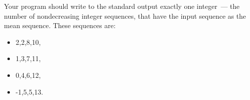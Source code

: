 Your program should write to the standard output exactly one integer~--- the number of nondecreasing integer
sequences, that have the input sequence as the mean sequence. These sequences are:

\begin{itemize}
\item 2,2,8,10,
\item 1,3,7,11,
\item 0,4,6,12,
\item -1,5,5,13.
\end{itemize}